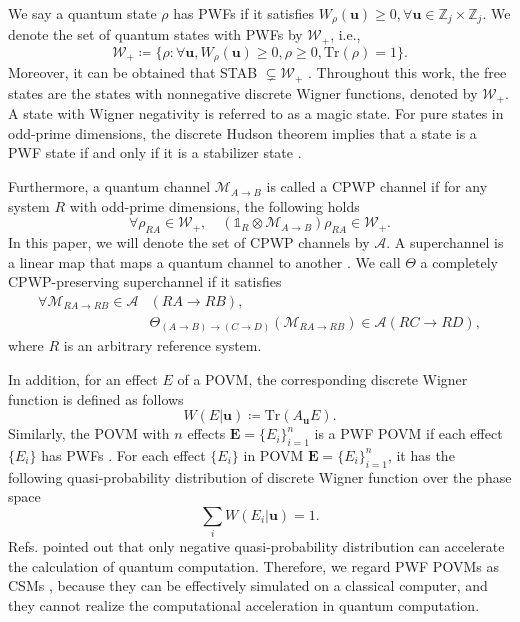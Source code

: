 \documentclass[aps,pra,twocolumn,floatfix,amsfonts,10pt]{revtex4-2}
\begin{document}
We say a quantum state $\rho$ has PWFs if it satisfies $W_{\rho}(\mathbf{u})\geqslant0, \forall \mathbf{u} \in \mathbb{Z}_{j} \times \mathbb{Z}_{j}$.
We denote the set of quantum states with PWFs by $\mathcal{W}_+$, i.e.,
\begin{equation}
	\mathcal{W}_+\coloneqq \{\rho:\forall \mathbf{u}, W_\rho(\mathbf{u})\geqslant0, \rho\geqslant 0, \mathrm{Tr}(\rho)=1\}.
\end{equation}
Moreover, it can be obtained that STAB $\subsetneq \mathcal{W}_+$ \cite{VFG+2012,WWS2020}. 
Throughout this work, the free states are the states with nonnegative discrete Wigner functions, denoted by $\mathcal{W}_+$.
A state with Wigner negativity is referred to as a magic state.
For pure states in odd-prime dimensions, the discrete Hudson theorem implies that a state is a PWF state if and only if it is a stabilizer state \cite{G2006}. 

Furthermore, a quantum channel $\mathcal{M}_{A \rightarrow B}$ is called a CPWP channel \cite{WWS2019} if for any system $R$ with odd-prime dimensions, the following holds
\begin{equation}
	\forall \rho_{RA}\in \mathcal{W}_+, \quad (\mathds{1}_R \otimes \mathcal{M}_{A \rightarrow B})\rho_{RA} \in \mathcal{W}_+.
\end{equation}
In this paper, we will denote the set of CPWP channels by $\mathcal{A}$.
A superchannel is a linear map that maps a quantum channel to
another \cite{CDP2008+}.
We call $\Theta$ a completely CPWP-preserving superchannel \cite{WWS2019} if it satisfies
\begin{equation}
	\begin{aligned}
		\forall \mathcal{M}_{RA\rightarrow RB} \in \mathcal{A}&(RA\rightarrow RB), \\ &\Theta_{(A\rightarrow B)\rightarrow(C\rightarrow D)}\left(\mathcal{M}_{RA\rightarrow RB}\right) \in \mathcal{A}(RC\rightarrow RD),
	\end{aligned}
\end{equation}
where $R$ is an arbitrary reference system.

In addition, for an effect $E$ of a POVM, the corresponding discrete Wigner function is defined as follows
\begin{equation}
	W(E|\mathbf{u}) \coloneqq \mathrm{Tr}(A_{\mathbf{u}}E).
\end{equation}
Similarly, the POVM with $n$ effects $\mathbf{E} = \{E_i\}_{i=1}^{n}$ is a PWF POVM if each effect $\{E_i\}$ has PWFs \cite{PWB2015,ZLZ+2024}.
For each effect $\{E_i\}$ in POVM $\mathbf{E} = \{E_i\}_{i=1}^{n}$, it has the following quasi-probability distribution of discrete Wigner function over the phase space 
\begin{equation}
	\displaystyle\sum_{i}W(E_i|\mathbf{u}) = 1.
\end{equation}
Refs. \cite{VFG+2012,G2006} pointed out that only negative quasi-probability distribution can accelerate the calculation of quantum computation.
Therefore, we regard PWF POVMs as CSMs \cite{HWV+2014}, because they can be effectively simulated on a classical computer, and they cannot realize the computational acceleration in quantum computation.
\end{document}
